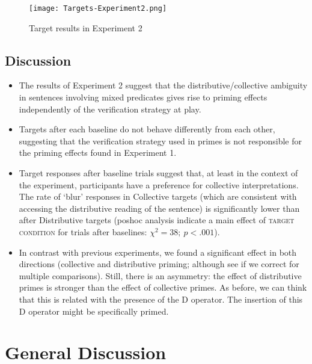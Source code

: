 \documentclass[a4paper]{article}
\begin{document}
\begin{figure}[h!]
  \centering
    \texttt{[image: Targets-Experiment2.png]}
         \caption{Target results in Experiment 2}
        \label{fig:targetresults.exp2}
    \end{figure}


\subsection{Discussion}

\begin{itemize}
\item The results of Experiment 2 suggest that the distributive/collective ambiguity in sentences involving mixed predicates gives rise to priming effects independently of the verification strategy at play. 

\item Targets after each baseline do not behave differently from each other, suggesting that the verification strategy used in primes is not responsible for the priming effects found in Experiment 1. 

\item Target responses after baseline trials suggest that, at least in the context of the experiment, participants have a preference for collective interpretations. The rate of `blur' responses in Collective targets (which are consistent with accessing the distributive reading of the sentence) is significantly lower than after Distributive targets (poshoc analysis indicate a main effect of \textsc{target condition} for trials after baselines: $\chi^{2} = 38; \ p<.001$). 

\item In contrast with previous experiments, we found a significant effect in both directions (collective and distributive priming; although see if we correct for multiple comparisons). Still, there is an asymmetry: the effect of distributive primes is stronger than the effect of collective primes. As before, we can think that this is related with the presence of the D operator. The insertion of this D operator might be specifically primed. 

\end{itemize}

\section{General Discussion}
\end{document}
